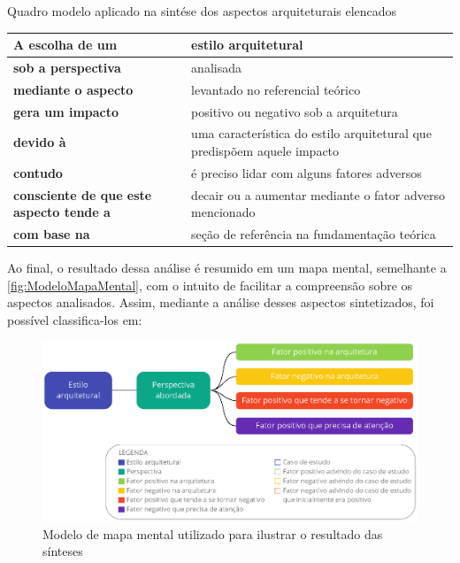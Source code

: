 \begin{quadro}
    \caption{Quadro modelo aplicado na sintése dos aspectos arquiteturais elencados\label{modelo-sintese}}
    \begin{tabularx}{\linewidth}{ | p{5cm} | X | }
    \hline
    \textbf{A escolha de um}        &  estilo arquitetural \\ \hline
    \textbf{sob a perspectiva}      &  analisada \\ \hline
    \textbf{mediante o aspecto}     &  levantado no referencial teórico \\ \hline
    \textbf{gera um impacto}        &  positivo ou negativo sob a arquitetura \\ \hline
    \textbf{devido à }              &  uma característica do estilo arquitetural que predispõem aquele impacto \\ \hline
    \textbf{contudo}                &  é preciso lidar com alguns fatores adversos \\ \hline
    \textbf{consciente de que este aspecto tende a } & decair ou a aumentar mediante o fator adverso mencionado \\ \hline
    \textbf{com base na}            &  seção de referência na fundamentação teórica \\ \hline
    \end{tabularx}
\end{quadro}

Ao final, o resultado dessa análise é resumido em um mapa mental, semelhante a
\autoref{fig:ModeloMapaMental}, com o intuito de facilitar a compreensão sobre os aspectos
analisados. Assim, mediante a análise desses aspectos sintetizados, foi possível classifica-los em:

\begin{figure}[h]
  \centering
  \includegraphics[keepaspectratio=true,scale=0.6]{figuras/modelo-mapa-mental.eps}
  \caption{Modelo de mapa mental utilizado para ilustrar o resultado das sínteses\label{fig:ModeloMapaMental}}
\end{figure}

